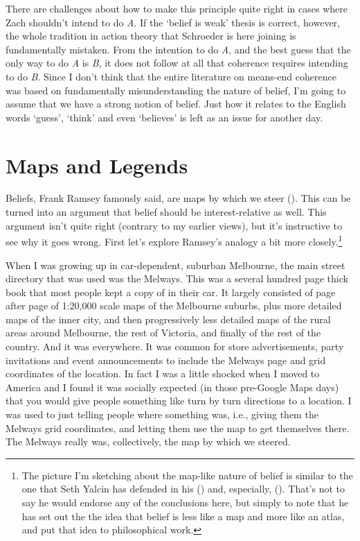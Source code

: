 \documentclass[
  10pt,
  letterpaper,
  twoside]{scrbook}
\begin{document}
There are challenges about how to make this principle quite right in
cases where Zach shouldn't intend to do \emph{A}. If the `belief is
weak' thesis is correct, however, the whole tradition in action theory
that Schroeder is here joining is fundamentally mistaken. From the
intention to do \emph{A}, and the best guess that the only way to do
\emph{A} is \emph{B}, it does not follow at all that coherence requires
intending to do \emph{B}. Since I don't think that the entire literature
on means-end coherence was based on fundamentally misunderstanding the
nature of belief, I'm going to assume that we have a strong notion of
belief. Just how it relates to the English words `guess', `think' and
even `believes' is left as an issue for another day.

\section{Maps and Legends}\label{sec-mapslegends}

Beliefs, Frank Ramsey famously said, are maps by which we steer
(). This can be
turned into an argument that belief should be interest-relative as well.
This argument isn't quite right (contrary to my earlier views), but it's
instructive to see why it goes wrong. First let's explore Ramsey's
analogy a bit more closely.\footnote{The picture I'm sketching about the
  map-like nature of belief is similar to the one that Seth Yalcin has
  defended in his () and, especially,
  (). That's not to say he would endorse
  any of the conclusions here, but simply to note that he has set out
  the the idea that belief is less like a map and more like an atlas,
  and put that idea to philosophical work.}

When I was growing up in car-dependent, suburban Melbourne, the main
street directory that was used was the Melways. This was a several
hundred page thick book that most people kept a copy of in their car. It
largely consisted of page after page of 1:20,000 scale maps of the
Melbourne suburbs, plus more detailed maps of the inner city, and then
progressively less detailed maps of the rural areas around Melbourne,
the rest of Victoria, and finally of the rest of the country. And it was
everywhere. It was common for store advertisements, party invitations
and event announcements to include the Melways page and grid coordinates
of the location. In fact I was a little shocked when I moved to America
and I found it was socially expected (in those pre-Google Maps days)
that you would give people something like turn by turn directions to a
location. I was used to just telling people where something was, i.e.,
giving them the Melways grid coordinates, and letting them use the map
to get themselves there. The Melways really was, collectively, the map
by which we steered.
\end{document}
